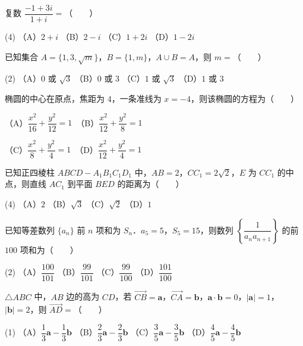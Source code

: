 \begin{question}
复数 $\dfrac{-1+3i}{1+i}=$\mbox{（　　）}

\begin{gkopts}(4)
\task （A）$2+i$
\task （B）$2-i$
\task （C）$1+2i$
\task （D）$1-2i$
\end{gkopts}

\end{question}
\begin{question}
已知集合 $A=\{1,3,\sqrt m\}$，$B=\{1,m\}$，$A\cup B=A$，则 $m=$\mbox{（　　）}

\begin{gkopts}(2)
\task （A）$0$ 或 $\sqrt3$
\task （B）$0$ 或 $3$
\task （C）$1$ 或 $\sqrt3$
\task （D）$1$ 或 $3$
\end{gkopts}

\end{question}
\begin{question}
椭圆的中心在原点，焦距为 $4$，一条准线为 $x=-4$，则该椭圆的方程为\mbox{（　　）}

（A）$\dfrac{x^2}{16}+\dfrac{y^2}{12}=1$　（B）$\dfrac{x^2}{12}+\dfrac{y^2}{8}=1$

（C）$\dfrac{x^2}{8}+\dfrac{y^2}{4}=1$　（D）$\dfrac{x^2}{12}+\dfrac{y^2}{4}=1$

\end{question}
\begin{question}
已知正四棱柱 $ABCD-A_1B_1C_1D_1$ 中，$AB=2$，$CC_1=2\sqrt2$，$E$ 为 $CC_1$ 的中点，则直线 $AC_1$ 到平面 $BED$ 的距离为\mbox{（　　）}

\begin{gkopts}(4)
\task （A）$2$
\task （B）$\sqrt3$
\task （C）$\sqrt2$
\task （D）$1$
\end{gkopts}

\end{question}
\begin{question}
已知等差数列 $\{a_n\}$ 前 $n$ 项和为 $S_n$．$a_5=5$，$S_5=15$，则数列 $\left\{\dfrac1{a_na_{n+1}}\right\}$ 的前 $100$ 项和为\mbox{（　　）}

\begin{gkopts}(2)
\task （A）$\dfrac{100}{101}$
\task （B）$\dfrac{99}{101}$
\task （C）$\dfrac{99}{100}$
\task （D）$\dfrac{101}{100}$
\end{gkopts}

\end{question}
\begin{question}
$\triangle ABC$ 中，$AB$ 边的高为 $CD$，若 $\overrightarrow{CB}=\boldsymbol a$，$\overrightarrow{CA}=\boldsymbol b$，$\boldsymbol a\cdot\boldsymbol b=0$，$|\boldsymbol a|=1$，$|\boldsymbol b|=2$，则 $\overrightarrow{AD}=$\mbox{（　　）}

\begin{gkopts}(1)
\task （A）$\dfrac13\boldsymbol a-\dfrac13\boldsymbol b$
\task （B）$\dfrac23\boldsymbol a-\dfrac23\boldsymbol b$
\task （C）$\dfrac35\boldsymbol a-\dfrac35\boldsymbol b$
\task （D）$\dfrac45\boldsymbol a-\dfrac45\boldsymbol b$
\end{gkopts}

\end{question}
